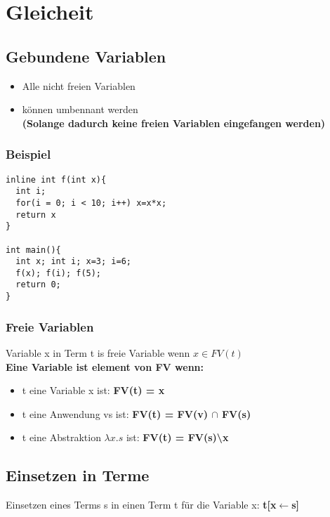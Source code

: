 \section{Gleicheit}

\subsection{Gebundene Variablen}
\begin{itemize}
    \item Alle nicht freien Variablen
    \item können umbennant werden \\
          \textbf{(Solange dadurch keine freien Variablen eingefangen werden)}
\end{itemize}

\subsubsection{Beispiel}
\lstset{language=C,style=customstyle}
\begin{lstlisting}
inline int f(int x){
  int i;
  for(i = 0; i < 10; i++) x=x*x;
  return x
}

int main(){
  int x; int i; x=3; i=6;
  f(x); f(i); f(5);
  return 0;
}
\end{lstlisting}

\subsubsection{Freie Variablen}
Variable x in Term t is freie Variable wenn $x \in FV(t)$ \\
\textbf{Eine Variable ist element von FV wenn:}
\begin{itemize}
    \item t eine Variable x ist: \textbf{FV(t) = {x}}
    \item t eine Anwendung vs ist: \textbf{FV(t) = FV(v) $\cap$ FV(s)}
    \item t eine Abstraktion $\lambda x.s$ ist: \textbf{FV(t) = FV(s)\textbackslash{x}}
\end{itemize}

\subsection{Einsetzen in Terme}
Einsetzen eines Terms s in einen Term t für die Variable x: \textbf{t[x$\leftarrow$s]}

